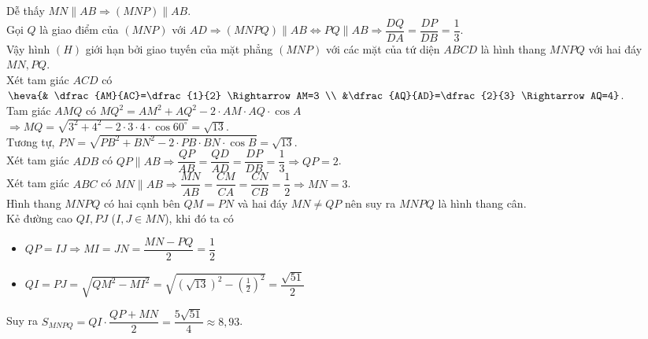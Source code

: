 \begin{ex}
{\begin{center}
		\end{center}
		Dễ thấy $MN \parallel AB \Rightarrow (MNP) \parallel AB$. \\
		Gọi $Q$ là giao điểm của $(MNP)$ với $AD \Rightarrow (MNPQ) \parallel AB \Leftrightarrow PQ \parallel AB \Rightarrow \dfrac{DQ}{DA}=\dfrac{DP}{DB}=\dfrac{1}{3}$. \\
		Vậy hình $(H)$ giới hạn bởi giao tuyến của mặt phẳng $(MNP)$ với các mặt của tứ diện $ABCD$ là hình thang $MNPQ$ với hai đáy $MN, PQ$. \\
		Xét tam giác $ACD$ có $
		  \heva{& \dfrac{AM}{AC}=\dfrac{1}{2} \Rightarrow AM=3 \\ &\dfrac{AQ}{AD}=\dfrac{2}{3} \Rightarrow AQ=4}$. \\
		Tam giác $AMQ$ có $MQ^2=AM^2+AQ^2 - 2 \cdot AM \cdot AQ \cdot \cos A$ \\
		  $\Rightarrow MQ=\sqrt{3^2+4^2 - 2 \cdot 3 \cdot 4 \cdot \cos 60^\circ}=\sqrt{13}$. \\
		Tương tự, $PN=\sqrt{PB^2+BN^2 - 2 \cdot PB \cdot BN \cdot \cos B}=\sqrt{13}$. \\
		Xét tam giác $ADB$ có $QP \parallel AB \Rightarrow \dfrac{QP}{AB}=\dfrac{QD}{AD}=\dfrac{DP}{DB}=\dfrac{1}{3} \Rightarrow QP=2$. \\
		Xét tam giác $ABC$ có $MN \parallel AB \Rightarrow \dfrac{MN}{AB}=\dfrac{CM}{CA}=\dfrac{CN}{CB}=\dfrac{1}{2} \Rightarrow MN=3$.\\
		Hình thang $MNPQ$ có hai cạnh bên $QM=PN$ và hai đáy $MN \neq QP$ nên suy ra $MNPQ$ là hình thang cân. \\
		Kẻ đường cao $QI, PJ$ ($I, J \in MN$), khi đó ta có
		\begin{itemize}
		    \item $QP=IJ \Rightarrow MI=JN=\dfrac{MN - PQ}{2}=\dfrac{1}{2}$
		    \item $QI=PJ=\sqrt{QM^2 - MI^2}=\sqrt{(\sqrt{13})^2 - \left(\frac{1}{2}\right)^2}=\dfrac{\sqrt{51}}{2}$
		\end{itemize}
		Suy ra $S_{MNPQ}=QI \cdot \dfrac{QP+MN}{2}=\dfrac{5\sqrt{51}}{4} \approx 8{,}93$.
	}
\end{ex}

